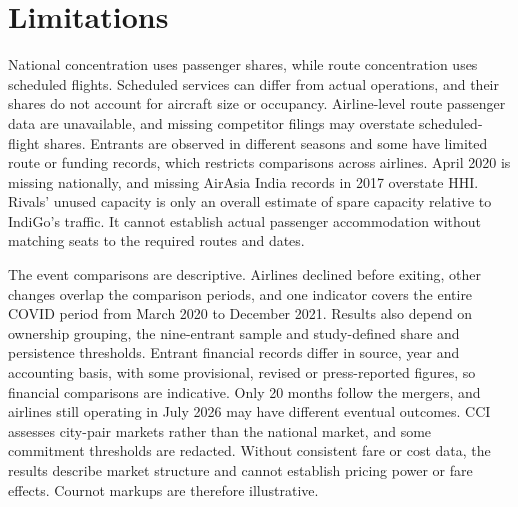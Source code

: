 \section{Limitations}
\begingroup
\color{black}
National concentration uses passenger shares, while route concentration uses scheduled flights. Scheduled services can differ from actual operations, and their shares do not account for aircraft size or occupancy. Airline-level route passenger data are unavailable, and missing competitor filings may overstate scheduled-flight shares. Entrants are observed in different seasons and some have limited route or funding records, which restricts comparisons across airlines. April 2020 is missing nationally, and missing AirAsia India records in 2017 overstate HHI. Rivals' unused capacity is only an overall estimate of spare capacity relative to IndiGo's traffic. It cannot establish actual passenger accommodation without matching seats to the required routes and dates.

The event comparisons are descriptive. Airlines declined before exiting, other changes overlap the comparison periods, and one indicator covers the entire COVID period from March 2020 to December 2021. Results also depend on ownership grouping, the nine-entrant sample and study-defined share and persistence thresholds. Entrant financial records differ in source, year and accounting basis, with some provisional, revised or press-reported figures, so financial comparisons are indicative. Only 20 months follow the mergers, and airlines still operating in July 2026 may have different eventual outcomes. CCI assesses city-pair markets rather than the national market, and some commitment thresholds are redacted. Without consistent fare or cost data, the results describe market structure and cannot establish pricing power or fare effects. Cournot markups are therefore illustrative.
\par
\endgroup
